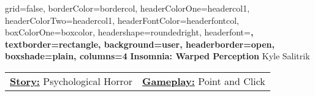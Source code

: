 \documentclass[archE1,portrait]{baposter}
\begin{document}
\background{ %

}

\begin{poster}
{
	grid=false,
	borderColor=bordercol, %
	headerColorOne=headercol1, %
	headerColorTwo=headercol1, %
	headerFontColor=headerfontcol, %
	boxColorOne=boxcolor, %
	headershape=roundedright, %
	headerfont=\Large\sf\bf, %
	textborder=rectangle,
	background=user,
	headerborder=open, %
	boxshade=plain,
	columns=4
}
{}
%
%
{
\sf\bf Insomnia: Warped Perception} %
{\vspace{.5em} Kyle Salitrik\\ %
} %
%




{ 
	\begin{tabularx}{\textwidth}{ X | X }
	\underline{\textbf{Story:}} Psychological Horror & \underline{\textbf{Gameplay:}} Point and Click
	\end{tabularx}
	\vspace*{-.6\baselineskip}
}



\end{poster}
\end{document}
